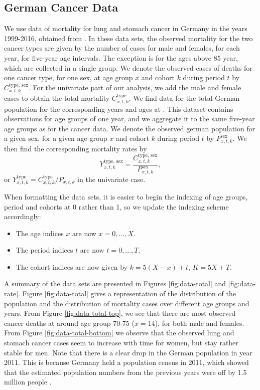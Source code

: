 \subsection{German Cancer Data}
\label{sec:GermanCancerData}
We use data of mortality for lung and stomach cancer in Germany in the years 1999-2016, obtained from \textcite{cancerData}. In these data sets, the observed mortality for the two cancer types are given by the number of cases for male and females, for each year, for five-year age intervals. The exception is for the ages above 85 year, which are collected in a single group. We denote the observed cases of deaths for one cancer type, for one sex, at age group $x$ and cohort $k$ during period $t$ by $C_{x,t,k}^{\text{type, sex}}$. For the univariate part of our analysis, we add the male and female cases to obtain the total mortality $C_{x,t,k}^{\text{type}}$. We find data for the total German population for the corresponding years and ages at \textcite{germanPopulation}. This dataset contains observations for age groups of one year, and we aggregate it to the same five-year age groups as for the cancer data. We denote the observed german population for a given sex, for a given age group $x$ and cohort $k$ during period $t$ by $P_{x,t,k}^{\text{sex}}$. We then find the corresponding mortality rates by
\begin{equation}
    Y_{x,t,k}^{\text{type, sex}} = \frac{C_{x,t,k}^{\text{type, sex}}}{P_{x,t,k}^{\text{sex}}},
\end{equation}
or $Y_{x,t,k}^{\text{type}} = C_{x,t,k}^{\text{type}}/P_{x,t,k}$ in the univariate case.

\newpar When formatting the data sets, it is easier to begin the indexing of age groups, period and cohorts at 0 rather than 1, so we update the indexing scheme accordingly:
\begin{itemize}
    \item The age indices $x$ are now $x = 0,\ldots,X$.
    \item The period indices $t$ are now $t = 0, \ldots, T$.
    \item The cohort indices are now given by $k = 5(X - x) + t$, $K = 5X + T$.
\end{itemize}

\newpar A summary of the data sets are presented in Figures \ref{fig:data-total} and \ref{fig:data-rate}. Figure \ref{fig:data-total} gives a representation of the distribution of the population and the distribution of mortality cases over different age groups and years. From Figure \ref{fig:data-total-top}, we see that there are most observed cancer deaths at around age group 70-75 ($x = 14$), for both male and females. From Figure \ref{fig:data-total-bottom} we observe that the observed lung and stomach cancer cases seem to increase with time for women, but stay rather stable for men. Note that there is a clear drop in the German population in year 2011. This is because Germany held a population census in 2011, which showed that the estimated population numbers from the previous years were off by 1.5 million people \parencite{germanCensus}.

